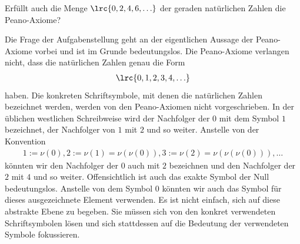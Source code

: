 \begin{mychallenge}\label{mychallenge:0106}
	Erfüllt auch die Menge $\lrc{0,2,4,6,\ldots}$  der geraden natürlichen Zahlen die Peano-Axiome?
	\begin{myanswer}
		Die Frage der Aufgabenstellung geht an der eigentlichen Aussage der Peano-Axiome vorbei und ist im Grunde bedeutungslos.
		Die Peano-Axiome verlangen nicht, dass die natürlichen Zahlen genau die Form
		\begin{align*}
			\lrc{0,1,2,3,4,\ldots}
		\end{align*}
		haben.
		Die konkreten Schriftsymbole, mit denen die natürlichen Zahlen bezeichnet werden, werden von den Peano-Axiomen nicht vorgeschrieben.
		In der üblichen westlichen Schreibweise wird der Nachfolger der $0$ mit dem Symbol $1$ bezeichnet, der Nachfolger von $1$ mit $2$ und so weiter.
		Anstelle von der Konvention
		\begin{align*}
			1:=\nu(0), 2:=\nu(1)=\nu(\nu(0)), 3:=\nu(2)=\nu(\nu(\nu(0))), \ldots
		\end{align*}
		könnten wir den Nachfolger der $0$ auch mit $2$ bezeichnen und den Nachfolger der $2$ mit $4$ und so weiter.
		Offensichtlich ist auch das exakte Symbol der Null bedeutungslos.
		Anstelle von dem Symbol $0$ könnten wir auch das Symbol  für dieses ausgezeichnete Element verwenden.
		Es ist nicht einfach, sich auf diese abstrakte Ebene zu begeben.
		Sie müssen sich von den konkret verwendeten Schriftsymbolen lösen und sich stattdessen auf die Bedeutung der verwendeten Symbole fokussieren.
	\end{myanswer}
\end{mychallenge}

